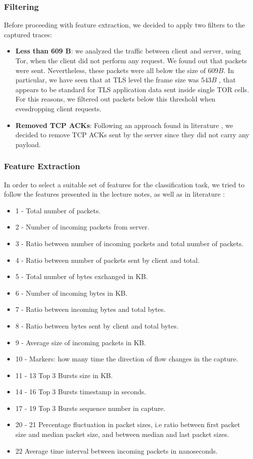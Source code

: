 \documentclass[10pt,conference,compsocconf]{IEEEtran}
\begin{document}
\subsubsection{Filtering}
Before proceeding with feature extraction, we decided to apply two filters to the captured traces:
\begin{itemize}
    \item \textbf{Less than 609 B}: we analyzed the traffic between client and server, using Tor, when the client did not perform any request.
    We found out that packets were sent. Nevertheless, these packets were all below the size of $609B$.
    In particular, we have seen that at TLS level the frame size was $543 B$ , that appears to be standard for TLS
    application data sent inside single TOR cells.  For this reasons, we filtered out packets below this threshold when evesdropping client requests.
    \item \textbf{Removed TCP ACKs}: Following an approach found in literature \cite{web_fingerprinting}, we decided to
    remove TCP ACKs sent by the server since they did not carry any payload.
\end{itemize}
\subsubsection{Feature Extraction}
In order to select a suitable set of features for the classification task, we tried to follow the features presented in
the lecture notes, as well as in literature \cite{web_fingerprinting}:
\begin{itemize}
    \item 1 - Total number of packets.
    \item 2 - Number of incoming packets from server.
    \item 3 - Ratio between number of incoming packets and total number of packets.
    \item 4 - Ratio between number of packets sent by client and total.
    \item 5 - Total number of bytes exchanged in KB.
    \item 6 - Number of incoming bytes in KB.
    \item 7 - Ratio between incoming bytes and total bytes.
    \item 8 - Ratio between bytes sent by client and total bytes.
    \item 9 - Average size of incoming packets in KB.
    \item 10 - Markers: how many time the direction of flow changes in the capture.
    \item 11 - 13 Top 3 Bursts size in KB.
    \item 14 - 16 Top 3 Bursts timestamp in seconds.
    \item 17 - 19 Top 3 Bursts sequence number in capture.
    \item 20 - 21 Percentage fluctuation in packet sizes, i.e ratio between first packet size and median packet size, and between median and last packet sizes.
    \item 22 Average time interval between incoming packets in nanoseconds.
\end{itemize}
\end{document}
